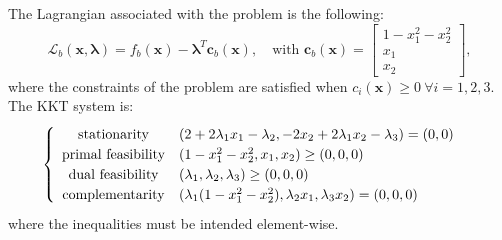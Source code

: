 \documentclass[a4paper,11pt]{article}
\begin{document}
\noindent The Lagrangian associated with the problem is the following:
\begin{equation}
	\mathcal{L}_b(\textbf{x},\boldsymbol{\lambda}) = f_b(\textbf{x}) - \boldsymbol{\lambda}^T \textbf{c}_b(\textbf{x}), \quad \text{with } \textbf{c}_b(\textbf{x}) = \begin{bmatrix}
		1-x_{1}^2 - x_2^2\\
		x_1\\
		x_2
	\end{bmatrix},
\end{equation}
where the constraints of the problem are satisfied when $c_i(\textbf{x})\ge 0\ \forall i = 1,2,3$. The KKT system is:
\begin{equation}
	\begin{cases}
		\begin{array}{c l}
			\text{stationarity} & (2 + 2\lambda_{1}x_{1} -\lambda_{2}, -2x_{2}+2\lambda_{1}x_{2}-\lambda_{3}) = (0,0) \\
			\text{primal feasibility} &(1 - x_{1}^2 -x_{2}^2, x_{1}, x_{2}) \ge (0,0,0) \\
			\text{dual feasibility} & (\lambda_{1}, \lambda_{2}, \lambda_{3}) \ge (0,0,0) \\
			\text{complementarity} &(\lambda_{1}(1-x_{1}^2-x_{2}^2), \lambda_{2}x_{1}, \lambda_{3}x_{2}) = (0,0,0)
		\end{array}
	\end{cases}
	\label{eq:KKT system f_b}
\end{equation}
where the inequalities must be intended element-wise.\\
\end{document}
